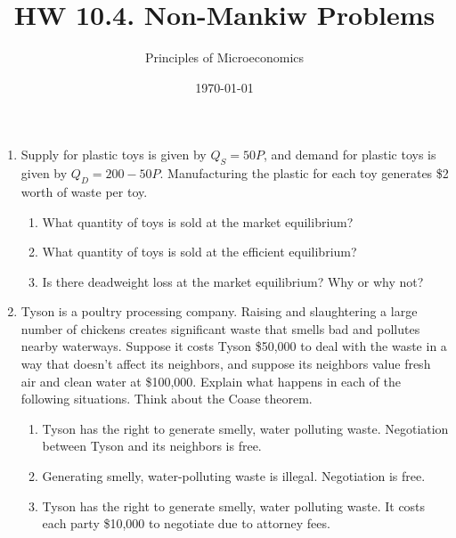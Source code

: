 \documentclass{article}
\title{HW 10.4. Non-Mankiw Problems}
\author{Principles of Microeconomics}
\date{\today}
\begin{document}
\maketitle

\begin{enumerate}

\item Supply for plastic toys is given by $Q_S = 50P$, and demand for plastic toys is given by $Q_D = 200 - 50P$. Manufacturing the plastic for each toy generates \$2 worth of waste per toy. 

	\begin{enumerate}
	
	\item What quantity of toys is sold at the market equilibrium? 
	
	\item What quantity of toys is sold at the efficient equilibrium? 
	
	\item Is there deadweight loss at the market equilibrium? Why or why not? 
	
	\end{enumerate}
	
\item Tyson is a poultry processing company. Raising and slaughtering a large number of chickens creates significant waste that smells bad and pollutes nearby waterways. Suppose it costs Tyson \$50,000 to deal with the waste in a way that doesn’t affect its neighbors, and suppose its neighbors value fresh air and clean water at \$100,000. Explain what happens in each of the following situations. Think about the Coase theorem.

	\begin{enumerate}
	
	\item Tyson has the right to generate smelly, water polluting waste. Negotiation between Tyson and its neighbors is free.
	
	\item Generating smelly, water-polluting waste is illegal. Negotiation is free.
	
	\item Tyson has the right to generate smelly, water polluting waste. It costs each party \$10,000 to negotiate due to attorney fees.
	
	\end{enumerate}

\end{enumerate}
\end{document}
